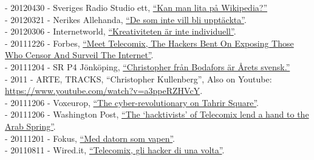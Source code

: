 \documentclass[a4paper,11pt,oneside]{article}
\begin{document}
    - 20120430 - Sveriges Radio Studio ett, \href{http://t.sr.se/1cRSOfk}{``Kan man lita på Wikipedia?''} \\
    - 20120321 - Nerikes Allehanda, \href{http://na.se/nyheter/orebro/1.1589481--de-som-inte-vill-blir-inte-upptackta-}{``De som inte vill bli upptäckta''}. \\
    - 20120306 - Internetworld, \href{http://www.idg.se/2.1085/1.435933/kreativiteten-ar-inte-individuell}{``Kreativiteten är inte individuell''}. \\
    - 20111226 - Forbes, \href{http://www.forbes.com/sites/andygreenberg/2011/12/26/meet-telecomix-the-hackers-bent-on-exposing-those-who-censor-and-surveil-the-internet/}{``Meet Telecomix, The Hackers Bent On Exposing Those Who Censor And Surveil The Internet''}. \\
    - 20111204 - SR P4 Jönköping, \href{http://t.sr.se/1gy095E}{``Christopher från Bodafors är Årets svensk.''} \\
    - 2011 - ARTE, TRACKS, ``Christopher Kullenberg'', Also on Youtube: \href{https://www.youtube.com/watch?v=a3ppeRZHVcY}{https://www.youtube.com/watch?v=a3ppeRZHVcY}.\\
    - 20111206 - Voxeurop, \href{http://www.voxeurop.eu/en/content/article/1254651-cyber-revolutionary-tahrir-square}{``The cyber-revolutionary on Tahrir Square''}. \\
    - 20111206 - Washington Post, \href{https://www.washingtonpost.com/lifestyle/style/the-hacktivists-of-telecomix-lend-a-hand-to-the-arab-spring/2011/12/05/gIQAAosraO_story.html}{``The ‘hacktivists’ of Telecomix lend a hand to the Arab Spring''}. \\
    - 20111201 - Fokus, \href{http://www.fokus.se/2011/12/med-datorn-som-vapen/}{``Med datorn som vapen''}. \\
    - 20110811 - Wired.it, \href{http://daily.wired.it/news/internet/2011/08/11/telecomix-hacker-egitto-tunisia-iran-13861.html}{``Telecomix, gli hacker di una volta''}. \\
\end{document}
